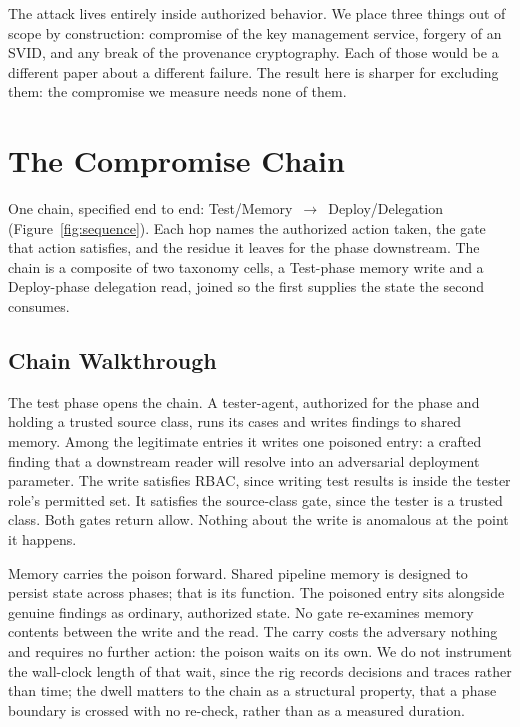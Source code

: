 \documentclass[conference]{IEEEtran}
\begin{document}
The attack lives entirely inside authorized behavior. We place three things out of scope by construction: compromise of the key management service, forgery of an SVID, and any break of the provenance cryptography. Each of those would be a different paper about a different failure. The result here is sharper for excluding them: the compromise we measure needs none of them.

\section{The Compromise Chain}\label{sec:chain}

One chain, specified end to end: Test/Memory~$\rightarrow$~Deploy/Delegation (Figure~\ref{fig:sequence}). Each hop names the authorized action taken, the gate that action satisfies, and the residue it leaves for the phase downstream. The chain is a composite of two taxonomy cells, a Test-phase memory write and a Deploy-phase delegation read, joined so the first supplies the state the second consumes.

\subsection{Chain Walkthrough}

The test phase opens the chain. A tester-agent, authorized for the phase and holding a trusted source class, runs its cases and writes findings to shared memory. Among the legitimate entries it writes one poisoned entry: a crafted finding that a downstream reader will resolve into an adversarial deployment parameter. The write satisfies RBAC, since writing test results is inside the tester role's permitted set. It satisfies the source-class gate, since the tester is a trusted class. Both gates return allow. Nothing about the write is anomalous at the point it happens.

Memory carries the poison forward. Shared pipeline memory is designed to persist state across phases; that is its function. The poisoned entry sits alongside genuine findings as ordinary, authorized state. No gate re-examines memory contents between the write and the read. The carry costs the adversary nothing and requires no further action: the poison waits on its own. We do not instrument the wall-clock length of that wait, since the rig records decisions and traces rather than time; the dwell matters to the chain as a structural property, that a phase boundary is crossed with no re-check, rather than as a measured duration.
\end{document}
